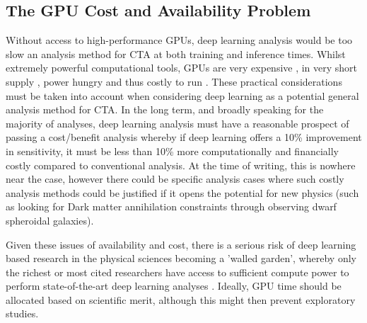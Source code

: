 \subsection{The GPU Cost and Availability Problem}
Without access to high-performance GPUs, deep learning analysis would be too slow an analysis method for CTA at both training and inference times. Whilst extremely powerful computational tools, GPUs are very expensive \cite{gpucost}, in very short supply \cite{gpushort}, power hungry \cite{2080ti} and thus costly to run \cite{2080ti}. These practical considerations must be taken into account when considering deep learning as a potential general analysis method for CTA. In the long term, and broadly speaking for the majority of analyses, deep learning analysis must have a reasonable prospect of passing a cost/benefit analysis whereby if deep learning offers a 10\% improvement in sensitivity, it must be less than 10\% more computationally and financially costly compared to conventional analysis. At the time of writing, this is nowhere near the case, however there could be specific analysis cases where such costly analysis methods could be justified if it opens the potential for new physics (such as looking for Dark matter annihilation constraints through observing dwarf spheroidal galaxies\cite{gloryduck}).

Given these issues of availability and cost, there is a serious risk of deep learning based research in the physical sciences becoming a 'walled garden', whereby only the richest or most cited researchers have access to sufficient compute power to perform state-of-the-art deep learning analyses \cite{gpudivide}. Ideally, GPU time should be allocated based on scientific merit, although this might then prevent exploratory studies.